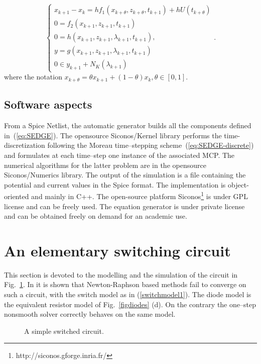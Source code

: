 \begin{equation}
  \label{eq:SEDGE-discrete}
  \left\{{  
      \begin{array}{l }
        x_{k+1}- x_{k} 
        = h f_1(x_{k+\theta},z_{k+\theta},t_{k+1}) + h U(t_{k+\theta}) \\
        0    =  f_2(x_{k+1},z_{k+1},t_{k+1})
        \\[2mm]
        0 = h(x_{k+1},z_{k+1},\lambda_{k+1},t_{k+1}),\\
        y = g(x_{k+1},z_{k+1},\lambda_{k+1},t_{k+1})\\
        0 \in y_{k+1} + N_K(\lambda_{k+1})
      \end{array}
    }\right. .
\end{equation}
where the notation $x_{k+\theta} = \theta x_{k+1}+(1-\theta)x_k, \theta \in [0,1]$.
\subsection{Software aspects} From a {\sc Spice} Netlist, the automatic generator builds all the components defined in~(\ref{eq:SEDGE}). The opensource {\sc Siconos/Kernel} library performs the time-discretization following the Moreau time--stepping scheme~(\ref{eq:SEDGE-discrete}) and formulates at each time--step one instance of the associated MCP. The numerical algorithms for the latter problem are in the opensource {\sc Siconos/Numerics} library. The output of the simulation is a file containing the potential and current values in the {\sc Spice} format. The implementation is object-oriented and mainly in C++. The open-source platform {\sc Siconos}\footnote{http://siconos.gforge.inria.fr/}\cite{acary-brogliato2008,Acary-Perignon2007,mathmod} is under GPL license and can be freely used. The equation generator is under private license and can be obtained freely on demand for an academic use.
\section{An elementary switching circuit}
\label{section3}
This section is devoted to the  modelling and the simulation of the circuit in Fig.~\ref{fig:figcircuit1}. In \cite{maffezzoni2006} it is shown that Newton-Raphson based methods fail to converge on such a circuit, with the switch model as in (\ref{switchmodel1}). The diode model is the equivalent resistor model of Fig.~\ref{figdiodes} (d). On the contrary the one--step nonsmooth solver correctly behaves on the same model.  
\begin{figure}[h]
  \centering
   \resizebox{\linewidth}{!}{
  
  }
  \caption{A simple switched circuit.}
  \label{fig:figcircuit1}
\end{figure}
